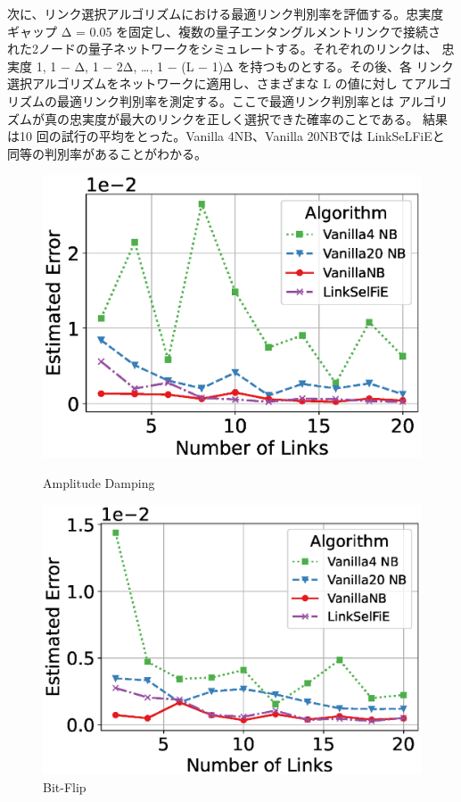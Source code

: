 \documentclass[conference]{IEEEtran}
\begin{document}
次に、リンク選択アルゴリズムにおける最適リンク判別率を評価する。忠実度
ギャップ Δ = 0.05 を固定し、複数の量子エンタングルメントリンクで接続さ
れた2ノードの量子ネットワークをシミュレートする。それぞれのリンクは、
忠実度 1, 1 − Δ, 1 − 2Δ, …, 1 − (L − 1)Δ を持つものとする。その後、各
リンク選択アルゴリズムをネットワークに適用し、さまざまな L の値に対し
てアルゴリズムの最適リンク判別率を測定する。ここで最適リンク判別率とは
アルゴリズムが真の忠実度が最大のリンクを正しく選択できた確率のことである。
結果は10 回の試行の平均をとった。Vanilla 4NB、Vanilla 20NBでは
LinkSeLFiEと同等の判別率があることがわかる。
\begin{figure}[h]
\centering
\begin{minipage}[b]{0.45\columnwidth}
\centering
\includegraphics[width=\textwidth]{figure/plot_error_vs_path_num_AmplitudeDamping.eps}
\caption{\small Amplitude Damping}\end{minipage}
\hfill
\begin{minipage}[b]{0.45\columnwidth}
\centering
\includegraphics[width=\textwidth]{figure/plot_error_vs_path_num_BitFlip.eps}
\caption{\small Bit-Flip}\end{minipage}
\end{figure}
\end{document}

